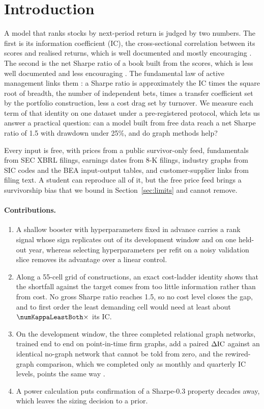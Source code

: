\section{Introduction}\label{sec:intro}

A model that ranks stocks by next-period return is judged by two numbers. The first is its information coefficient (IC), the cross-sectional correlation between its scores and realised returns, which is well documented and mostly encouraging \citep{gkx2020,chenpelgerzhu2024,kellymalamudzhou2024}. The second is the net Sharpe ratio of a book built from the scores, which is less well documented and less encouraging \citep{novymarxvelikov2016,avramov2023}. The fundamental law of active management links them \citep{grinold1989,clarke2002}: a Sharpe ratio is approximately the IC times the square root of breadth, the number of independent bets, times a transfer coefficient set by the portfolio construction, less a cost drag set by turnover. We measure each term of that identity on one dataset under a pre-registered protocol, which lets us answer a practical question: can a model built from free data reach a net Sharpe ratio of 1.5 with drawdown under 25\%, and do graph methods help?

Every input is free, with prices from a public survivor-only feed, fundamentals from SEC XBRL filings, earnings dates from 8-K filings, industry graphs from SIC codes and the BEA input-output tables, and customer-supplier links from filing text. A student can reproduce all of it, but the free price feed brings a survivorship bias that we bound in Section~\ref{sec:limits} and cannot remove.

\paragraph{Contributions.}
\begin{enumerate}
\item A shallow booster with hyperparameters fixed in advance carries a rank signal whose sign replicates out of its development window and on one held-out year, whereas selecting hyperparameters per refit on a noisy validation slice removes its advantage over a linear control.
\item Along a 55-cell grid of constructions, an exact cost-ladder identity shows that the shortfall against the target comes from too little information rather than from cost. No gross Sharpe ratio reaches 1.5, so no cost level closes the gap, and to first order the least demanding cell would need at least about $\numKappaLeastBoth\times$ its IC.
\item On the development window, the three completed relational graph networks, trained end to end on point-in-time firm graphs, add a paired $\Delta\mathrm{IC}$ against an identical no-graph network that cannot be told from zero, and the rewired-graph comparison, which we completed only as monthly and quarterly IC levels, points the same way \citep{maslovsneppen2002}.
\item A power calculation puts confirmation of a Sharpe-0.3 property decades away, which leaves the sizing decision to a prior.
\end{enumerate}

